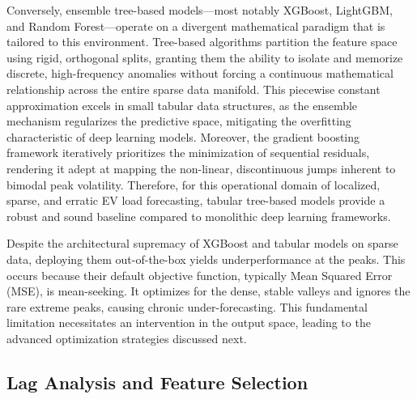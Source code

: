 \documentclass[pdflatex,sn-mathphys-num]{sn-jnl}%
\theoremstyle{thmstyleone}%
\theoremstyle{thmstyletwo}%
\theoremstyle{thmstylethree}%
\begin{document}
Conversely, ensemble tree-based models---most notably XGBoost, LightGBM, and Random Forest---operate on a divergent mathematical paradigm that is tailored to this environment. Tree-based algorithms partition the feature space using rigid, orthogonal splits, granting them the ability to isolate and memorize discrete, high-frequency anomalies without forcing a continuous mathematical relationship across the entire sparse data manifold. This piecewise constant approximation excels in small tabular data structures, as the ensemble mechanism regularizes the predictive space, mitigating the overfitting characteristic of deep learning models. Moreover, the gradient boosting framework iteratively prioritizes the minimization of sequential residuals, rendering it adept at mapping the non-linear, discontinuous jumps inherent to bimodal peak volatility. Therefore, for this operational domain of localized, sparse, and erratic EV load forecasting, tabular tree-based models provide a robust and sound baseline compared to monolithic deep learning frameworks.

Despite the architectural supremacy of XGBoost and tabular models on sparse data, deploying them out-of-the-box yields underperformance at the peaks. This occurs because their default objective function, typically Mean Squared Error (MSE), is mean-seeking. It optimizes for the dense, stable valleys and ignores the rare extreme peaks, causing chronic under-forecasting. This fundamental limitation necessitates an intervention in the output space, leading to the advanced optimization strategies discussed next.

\subsection{Lag Analysis and Feature Selection}\label{subsec:lag_analysis}
\end{document}
